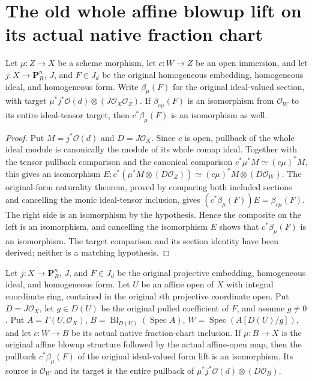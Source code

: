 \section{The old whole affine blowup lift on its actual native fraction chart}
\begin{proposition}
\label{prop:whole-open-original-form-transfer}
\leanok
Let $\mu:Z\to X$ be a scheme morphism, let $c:W\to Z$ be an open immersion,
and let $j:X\to\mathbf P_R^n$, $J$, and $F\in J_d$ be the original homogeneous
embedding, homogeneous ideal, and homogeneous form. Write $\beta_\mu(F)$ for
the original ideal-valued section, with target
$\mu^*j^*\mathcal O(d)\otimes(J\mathcal O_X\mathcal O_Z)$.
If $\beta_{c\mu}(F)$ is an isomorphism from $\mathcal O_W$ to its entire
ideal-tensor target, then $c^*\beta_\mu(F)$ is an isomorphism as well.
\end{proposition}
\begin{proof}
Put $M=j^*\mathcal O(d)$ and $D=J\mathcal O_X$. Since $c$ is open, pullback
of the whole ideal module is canonically the module of its whole comap ideal.
Together with the tensor pullback comparison and the canonical comparison
$c^*\mu^*M\simeq(c\mu)^*M$, this gives an isomorphism
$E:c^*(\mu^*M\otimes(D\mathcal O_Z))\simeq
 (c\mu)^*M\otimes(D\mathcal O_W)$.
The original-form naturality theorem, proved by comparing both included
sections and cancelling the monic ideal-tensor inclusion, gives
$(c^*\beta_\mu(F))E=\beta_{c\mu}(F)$.
The right side is an isomorphism by the hypothesis. Hence the composite on
the left is an isomorphism, and cancelling the isomorphism $E$ shows that
$c^*\beta_\mu(F)$ is an isomorphism. The target comparison and its section
identity have been derived; neither is a matching hypothesis.
\end{proof}
\begin{proposition}
\label{prop:whole-original-affine-blowup-fraction-basis}
\leanok
Let $j:X\to\mathbf P_R^n$, $J$, and $F\in J_d$ be the original projective
embedding, homogeneous ideal, and homogeneous form. Let $U$ be an affine open
of $X$ with integral coordinate ring, contained in the original $i$th projective
coordinate open. Put $D=J\mathcal O_X$, let $g\in D(U)$ be the original pulled
coefficient of $F$, and assume $g\ne0$. Put $A=\Gamma(U,\mathcal O_X)$,
$B=\operatorname{Bl}_{D(U)}(\operatorname{Spec}A)$,
$W=\operatorname{Spec}(A[D(U)/g])$, and let $c:W\to B$ be its actual native
fraction-chart inclusion. If $\mu:B\to X$ is the original affine blowup
structure followed by the actual affine-open map, then the pullback
$c^*\beta_\mu(F)$ of the original ideal-valued form lift is an isomorphism.
Its source is $\mathcal O_W$ and its target is the entire pullback of
$\mu^*j^*\mathcal O(d)\otimes(D\mathcal O_B)$.
\end{proposition}
